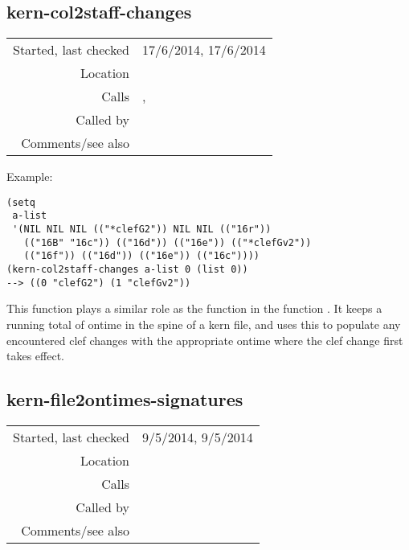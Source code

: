 \subsection*{kern-col2staff-changes}\label{fun:kern-col2staff-changes}

\vspace{0.3cm}
\begin{tabular}{r|p{8cm}}
Started, last checked & 17/6/2014, 17/6/2014 \\
Location & \nameref{sec:kern-to-staff-features} \\
Calls & \nameref{fun:constant-vector}, \nameref{fun:parse-kern-spaced-notes} \\
Called by & \nameref{fun:kern2clef-changes} \\
Comments/see also &
\end{tabular}

\vspace{0.5cm}
\noindent Example:
\begin{verbatim}
(setq
 a-list
 '(NIL NIL NIL (("*clefG2")) NIL NIL (("16r"))
   (("16B" "16c")) (("16d")) (("16e")) (("*clefGv2"))
   (("16f")) (("16d")) (("16e")) (("16c"))))
(kern-col2staff-changes a-list 0 (list 0))
--> ((0 "clefG2") (1 "clefGv2"))
\end{verbatim}

\noindent This function plays a similar role as the
function  in the
function . It
keeps a running total of ontime in the spine of a
kern file, and uses this to populate any encountered
clef changes with the appropriate ontime where the
clef change first takes effect.


\subsection*{kern-file2ontimes-signatures}\label{fun:kern-file2ontimes-signatures}

\vspace{0.3cm}
\begin{tabular}{r|p{8cm}}
Started, last checked & 9/5/2014, 9/5/2014 \\
Location & \nameref{sec:kern-to-staff-features} \\
Calls & \nameref{fun:tab-separated-string2list} \\
Called by & \\
Comments/see also & \nameref{fun:append-ontimes-to-time-signatures}
\end{tabular}

